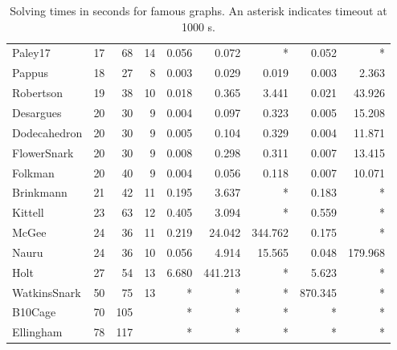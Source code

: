 \begin{table}[htb]
\begin{tabular}{l r r r r r r r r}
Paley17 & 17 & 68 & 14 & 0.056 & 0.072 & * & 0.052 & * \\
Pappus & 18 & 27 & 8 & 0.003 & 0.029 & 0.019 & 0.003 & 2.363 \\
Robertson & 19 & 38 & 10 & 0.018 & 0.365 & 3.441 & 0.021 & 43.926 \\
Desargues & 20 & 30 & 9 & 0.004 & 0.097 & 0.323 & 0.005 & 15.208 \\
Dodecahedron & 20 & 30 & 9 & 0.005 & 0.104 & 0.329 & 0.004 & 11.871 \\
FlowerSnark & 20 & 30 & 9 & 0.008 & 0.298 & 0.311 & 0.007 & 13.415 \\
Folkman & 20 & 40 & 9 & 0.004 & 0.056 & 0.118 & 0.007 & 10.071 \\
Brinkmann & 21 & 42 & 11 & 0.195 & 3.637 & * & 0.183 & * \\
Kittell & 23 & 63 & 12 & 0.405 & 3.094 & * & 0.559 & * \\
McGee & 24 & 36 & 11 & 0.219 & 24.042 & 344.762 & 0.175 & * \\
Nauru & 24 & 36 & 10 & 0.056 & 4.914 & 15.565 & 0.048 & 179.968 \\
Holt & 27 & 54 & 13 & 6.680 & 441.213 & * & 5.623 & * \\
WatkinsSnark & 50 & 75 & 13 & * & * & * & 870.345 & * \\
B10Cage & 70 & 105 & & * & * & * & * & * \\
Ellingham & 78 & 117 & & * & * & * & * & * \\
 \bottomrule
 \end{tabular}
 \caption{{Solving times in seconds for famous graphs.  An asterisk indicates timeout at 1000 s.}}
 \label{table:famous}
\end{table}

